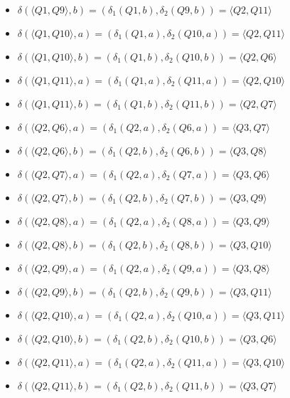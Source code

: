 \documentclass[12pt, a4paper]{article}
\begin{document}
\begin{enumerate}
\begin{itemize}
\begin{itemize}
        \item \(\delta(\langle Q1,Q9 \rangle,b)=(\delta_1(Q1,b),\delta_2(Q9,b))=\langle Q2,Q11 \rangle\)
        \item \(\delta(\langle Q1,Q10 \rangle,a)=(\delta_1(Q1,a),\delta_2(Q10,a))=\langle Q2,Q11 \rangle\)
        \item \(\delta(\langle Q1,Q10 \rangle,b)=(\delta_1(Q1,b),\delta_2(Q10,b))=\langle Q2,Q6 \rangle\)
        \item \(\delta(\langle Q1,Q11 \rangle,a)=(\delta_1(Q1,a),\delta_2(Q11,a))=\langle Q2,Q10 \rangle\)
        \item \(\delta(\langle Q1,Q11 \rangle,b)=(\delta_1(Q1,b),\delta_2(Q11,b))=\langle Q2,Q7 \rangle\)
        
        \item \(\delta(\langle Q2,Q6 \rangle,a)=(\delta_1(Q2,a),\delta_2(Q6,a))=\langle Q3,Q7 \rangle\)
        \item \(\delta(\langle Q2,Q6 \rangle,b)=(\delta_1(Q2,b),\delta_2(Q6,b))=\langle Q3,Q8 \rangle\)
        \item \(\delta(\langle Q2,Q7 \rangle,a)=(\delta_1(Q2,a),\delta_2(Q7,a))=\langle Q3,Q6 \rangle\)
        \item \(\delta(\langle Q2,Q7 \rangle,b)=(\delta_1(Q2,b),\delta_2(Q7,b))=\langle Q3,Q9 \rangle\)
        \item \(\delta(\langle Q2,Q8 \rangle,a)=(\delta_1(Q2,a),\delta_2(Q8,a))=\langle Q3,Q9 \rangle\)
        \item \(\delta(\langle Q2,Q8 \rangle,b)=(\delta_1(Q2,b),\delta_2(Q8,b))=\langle Q3,Q10 \rangle\)
        \item \(\delta(\langle Q2,Q9 \rangle,a)=(\delta_1(Q2,a),\delta_2(Q9,a))=\langle Q3,Q8 \rangle\)
        \item \(\delta(\langle Q2,Q9 \rangle,b)=(\delta_1(Q2,b),\delta_2(Q9,b))=\langle Q3,Q11 \rangle\)
        \item \(\delta(\langle Q2,Q10 \rangle,a)=(\delta_1(Q2,a),\delta_2(Q10,a))=\langle Q3,Q11 \rangle\)
        \item \(\delta(\langle Q2,Q10 \rangle,b)=(\delta_1(Q2,b),\delta_2(Q10,b))=\langle Q3,Q6 \rangle\)
        \item \(\delta(\langle Q2,Q11 \rangle,a)=(\delta_1(Q2,a),\delta_2(Q11,a))=\langle Q3,Q10 \rangle\)
        \item \(\delta(\langle Q2,Q11 \rangle,b)=(\delta_1(Q2,b),\delta_2(Q11,b))=\langle Q3,Q7 \rangle\)
        

\end{itemize}
\end{itemize}
\end{enumerate}
\end{document}

